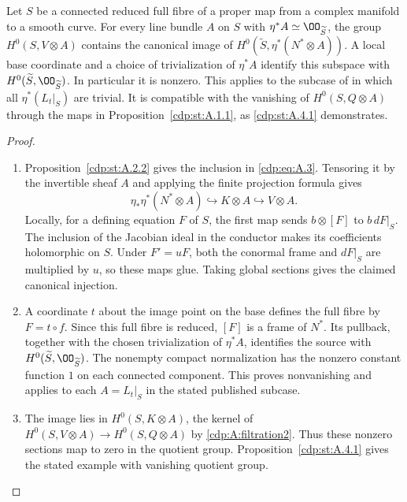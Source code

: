 \begin{proposition}\hypertarget{tag-01AZ}{}\label{cdp:st:A.5.1}

Let $S$ be a connected reduced full fibre of a proper map from a complex manifold to a smooth curve. For every line bundle $A$ on $S$ with $\eta^*A\simeq\OO_{\widetilde S}$, the group $H^0(S,V\otimes A)$ contains the canonical image of $H^0(\widetilde S,\eta^*(N^*\otimes A))$. A local base coordinate and a choice of trivialization of $\eta^*A$ identify this subspace with $H^0(\widetilde S,\OO_{\widetilde S})$. In particular it is nonzero. This applies to the subcase of \cite[Proposition~7.3, pp.~693--694]{CDP20} in which all $\eta^*(L_t|_S)$ are trivial. It is compatible with the vanishing of $H^0(S,Q\otimes A)$ through the maps in Proposition~\ref{cdp:st:A.1.1}, as \ref{cdp:st:A.4.1} demonstrates.
\end{proposition}


\begin{proof}
\begin{enumerate}[label={$\langle1\rangle$\arabic*.},leftmargin=*]
\item Proposition~\ref{cdp:st:A.2.2} gives the inclusion in
\eqref{cdp:eq:A.3}. Tensoring it by the invertible sheaf $A$ and applying
the finite projection formula gives
\[
 \eta_*\eta^*(N^*\otimes A)\hookrightarrow K\otimes A
                         \hookrightarrow V\otimes A.
\]
Locally, for a defining equation $F$ of $S$, the first map sends
$b\otimes[F]$ to $b\,dF|_S$. The inclusion of the Jacobian ideal in the
conductor makes its coefficients holomorphic on $S$. Under $F'=uF$,
both the conormal frame and $dF|_S$ are multiplied by $u$, so these maps
glue. Taking global sections gives the claimed canonical injection.

\item A coordinate $t$ about the image point on the base defines the full
fibre by $F=t\circ f$. Since this full fibre is reduced, $[F]$ is a frame
of $N^*$. Its pullback, together with the chosen trivialization of
$\eta^*A$, identifies the source with
$H^0(\widetilde S,\OO_{\widetilde S})$. The nonempty compact normalization
has the nonzero constant function $1$ on each connected component.
This proves nonvanishing and applies to each $A=L_t|_S$ in the stated
published subcase.

\item The image lies in $H^0(S,K\otimes A)$, the kernel of
$H^0(S,V\otimes A)\to H^0(S,Q\otimes A)$ by
\eqref{cdp:A:filtration2}. Thus these nonzero sections map to zero in
the quotient group. Proposition~\ref{cdp:st:A.4.1} gives the stated
example with vanishing quotient group.
\end{enumerate}
\end{proof}